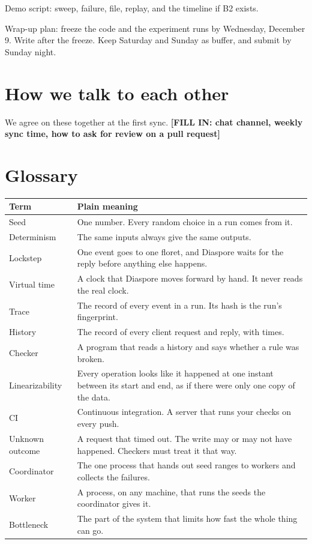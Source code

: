 \documentclass[12pt,letterpaper]{article}
\newcommand{\code}[1]{\texttt{\detokenize{#1}}}
\newcommand{\fillin}[1]{\textbf{[FILL IN: #1]}}
\begin{document}
Demo script: sweep, failure, \code{.pappus} file, replay, and the timeline if B2 exists.

Wrap-up plan: freeze the code and the experiment runs by Wednesday, December 9. Write after the freeze. Keep Saturday and Sunday as buffer, and submit by Sunday night.

\section{How we talk to each other}

We agree on these together at the first sync. \fillin{chat channel, weekly sync time, how to ask for review on a pull request}

\section{Glossary}

\begin{center}
\begin{tabularx}{\linewidth}{@{}l X@{}}
\toprule
\textbf{Term} & \textbf{Plain meaning} \\
\midrule
Seed & One number. Every random choice in a run comes from it. \\
Determinism & The same inputs always give the same outputs. \\
Lockstep & One event goes to one floret, and Diaspore waits for the reply before anything else happens. \\
Virtual time & A clock that Diaspore moves forward by hand. It never reads the real clock. \\
Trace & The record of every event in a run. Its hash is the run's fingerprint. \\
History & The record of every client request and reply, with times. \\
Checker & A program that reads a history and says whether a rule was broken. \\
Linearizability & Every operation looks like it happened at one instant between its start and end, as if there were only one copy of the data. \\
CI & Continuous integration. A server that runs your checks on every push. \\
Unknown outcome & A request that timed out. The write may or may not have happened. Checkers must treat it that way. \\
Coordinator & The one process that hands out seed ranges to workers and collects the failures. \\
Worker & A process, on any machine, that runs the seeds the coordinator gives it. \\
Bottleneck & The part of the system that limits how fast the whole thing can go. \\
\bottomrule
\end{tabularx}
\end{center}
\end{document}

